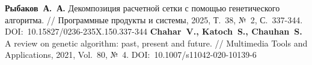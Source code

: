 \begin{thebibliography}{99}
\textbf{Рыбаков~А.~А.} Декомпозиция расчетной сетки с помощью генетического алгоритма. // Программные продукты и системы, 2025, Т.~38, №~2, С.~337-344. DOI:~10.15827/0236-235X.150.337-344
\textbf{Chahar~V., Katoch~S., Chauhan~S.} A review on genetic algorithm: past, present and future. // Multimedia Tools and Applications, 2021, Vol.~80, №~4. DOI:~10.1007/s11042-020-10139-6

\end{thebibliography}
